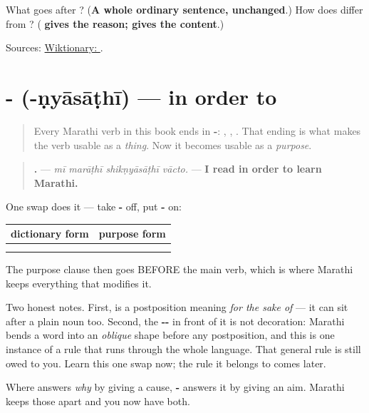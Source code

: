 \begin{tcolorbox}[breakable,colback=teal!4,colframe=teal!35!black,title={Before you move on}]
What goes after \textbf{}? (\textbf{A whole ordinary sentence, unchanged}.) How does \textbf{} differ from \textbf{}? (\textbf{ gives the reason;  gives the content}.)

Sources: \href{https://en.wiktionary.org/wiki/\%E0\%A4\%95\%E0\%A5\%80}{Wiktionary: }.
\end{tcolorbox}
\section[\texorpdfstring{-\mr{ण्यासाठी} (-ṇyāsāṭhī)}{-ण्यासाठी (-ṇyāsāṭhī)}]{- (-ṇyāsāṭhī) — in order to}

\label{lesson:MR-C35-saathi}



\begin{quote}
Every Marathi verb in this book ends in \textbf{-}: \textbf{}, \textbf{}, \textbf{}. That ending is what makes the verb usable as a \emph{thing}. Now it becomes usable as a \emph{purpose}.
\end{quote}

\begin{grammarlens}[title={Grammar Lens: swap -\mr{णे} for -\mr{ण्यासाठी}}]
\begin{quote}
\textbf{   .} — \emph{mī marāṭhī shikṇyāsāṭhī vācto.} — \textbf{I read in order to learn Marathi.}
\end{quote}

One swap does it — take \textbf{-} off, put \textbf{-} on:

\noindent
\begin{tabularx}{\linewidth}{@{}>{\raggedright\arraybackslash}X>{\raggedright\arraybackslash}X@{}}
\toprule
\textbf{dictionary form} & \textbf{purpose form} \\
\midrule
\mr{शिकणे} & \mr{शिकण्यासाठी} \\
\mr{वाचणे} & \mr{वाचण्यासाठी} \\
\bottomrule
\end{tabularx}

The purpose clause then goes BEFORE the main verb, which is where Marathi keeps everything that modifies it.

Two honest notes. First, \textbf{} is a postposition meaning \emph{for the sake of} — it can sit after a plain noun too. Second, the \textbf{--} in front of it is not decoration: Marathi bends a word into an \emph{oblique} shape before any postposition, and this is one instance of a rule that runs through the whole language. That general rule is still owed to you. Learn this one swap now; the rule it belongs to comes later.

Where \textbf{} answers \emph{why} by giving a cause, \textbf{-} answers it by giving an aim. Marathi keeps those apart and you now have both.
\end{grammarlens}

